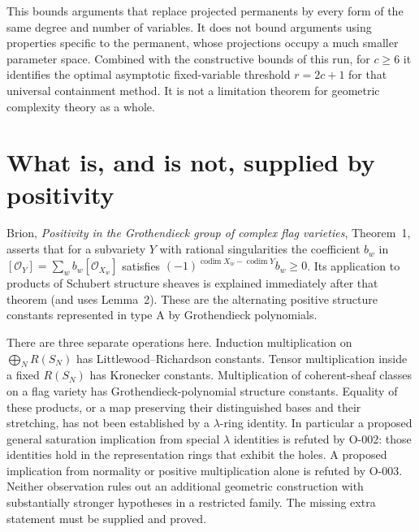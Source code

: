 This bounds arguments that replace projected permanents by every
form of the same degree and number of variables. It does not bound
arguments using properties specific to the permanent, whose
projections occupy a much smaller parameter space. Combined with
the constructive bounds of this run, for $c\geq6$ it identifies
the optimal asymptotic fixed-variable threshold $r=2c+1$ for that
universal containment method. It is not a limitation theorem for
geometric complexity theory as a whole.












\section{What is, and is not, supplied by positivity}

Brion, \emph{Positivity in the Grothendieck group of complex flag
varieties}, Theorem~1, asserts that for a subvariety $Y$ with rational
singularities the coefficient $b_w$ in
$[\mathcal O_Y]=\sum_w b_w[\mathcal O_{X_w}]$ satisfies
$(-1)^{\operatorname{codim}X_w-\operatorname{codim}Y}b_w\geq0$.
Its application to products of Schubert structure sheaves is explained
immediately after that theorem (and uses Lemma~2). These are the
alternating positive structure constants represented in type A by
Grothendieck polynomials.

There are three separate operations here. Induction multiplication on
$\bigoplus_N R(S_N)$ has Littlewood--Richardson constants. Tensor
multiplication inside a fixed $R(S_N)$ has Kronecker constants.
Multiplication of coherent-sheaf classes on a flag variety has
Grothendieck-polynomial structure constants. Equality of these
products, or a map preserving their distinguished bases and their
stretching, has not been established by a $\lambda$-ring identity.
In particular a proposed general saturation implication from special
$\lambda$ identities is refuted by O-002: those identities hold in
the representation rings that exhibit the holes.  A proposed
implication from normality or positive multiplication alone is refuted
by O-003. Neither observation rules out an additional geometric
construction with substantially stronger hypotheses in a restricted
family. The missing extra statement must be supplied and proved.


